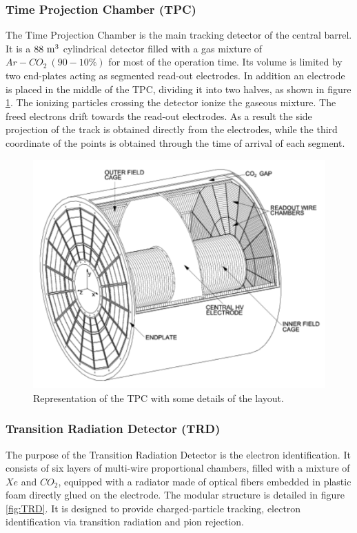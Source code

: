 \subsubsection{Time Projection Chamber (TPC)}
The Time Projection Chamber is the main tracking detector of the central barrel.
It is a $88\ \rm m^3$ cylindrical detector filled with a gas mixture of $Ar-CO_2\ (90-10 \% )$ for most of the operation time.
Its volume is limited by two end-plates acting as segmented read-out electrodes. 
In addition an electrode is placed in the middle of the TPC, dividing it into two halves, as shown in figure \ref{fig:TPC}.
The ionizing particles crossing the detector ionize the gaseous mixture.
The freed electrons drift towards the read-out electrodes.
As a result the side projection of the track is obtained directly from the electrodes, while the third coordinate of the points is obtained through the time of arrival of each segment.

\begin{figure}[!h]
\begin{center}
\includegraphics[width=0.7\linewidth]{Chapters/Introduction/Figs/tpc.pdf}
\caption{Representation of the TPC with some details of the layout.}
\label{fig:TPC}
\end{center}
\end{figure}

\subsubsection{Transition Radiation Detector (TRD)}
The purpose of the Transition Radiation Detector is the electron identification.
It consists of six layers of multi-wire proportional chambers, filled with a mixture of $Xe$ and $CO_2$, equipped with a radiator made of optical fibers embedded in plastic foam directly glued on the electrode.
The modular structure is detailed in figure \ref{fig:TRD}.
It is designed to provide charged-particle tracking, electron identification via transition radiation and pion rejection. 

